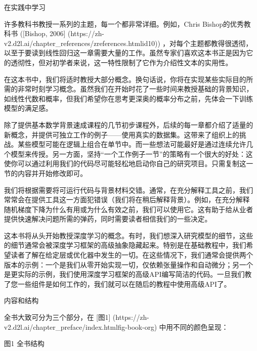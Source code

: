  在实践中学习

许多教科书教授一系列的主题，每一个都非常详细。例如，Chris Bishop的优秀教科书 ([Bishop, 2006]
(https://zh-v2.d2l.ai/chapter\_references/zreferences.htmlid10)) 
，对每个主题都教得很透彻，以至于要读到线性回归这一章需要大量的工作。虽然专家们喜欢这本书正是因为它的透彻性，但对初学者来说，这一特性限制了它作为介绍性文本的实用性。

在这本书中，我们将适时教授大部分概念。换句话说，你将在实现某些实际目的所需的非常时刻学习概念。虽然我们在开始时花了一些时间来教授基础的背景知识，如线性代数和概率，但我们希望你在思考更深奥的概率分布之前，先体会一下训练模型的满足感。

除了提供基本数学背景速成课程的几节初步课程外，后续的每一章都介绍了适量的新概念，并提供可独立工作的例子——使用真实的数据集。这带来了组织上的挑战。某些模型可能在逻辑上组合在单节中。而一些想法可能最好是通过连续允许几个模型来传授。另一方面，坚持“一个工作例子一节”的策略有一个很大的好处：这使你可以通过利用我们的代码尽可能轻松地启动你自己的研究项目。只需复制这一节的内容并开始修改即可。

我们将根据需要将可运行代码与背景材料交错。通常，在充分解释工具之前，我们常常会在提供工具这一方面犯错误（我们将在稍后解释背景）。例如，在充分解释随机梯度下降为什么有用或为什么有效之前，我们可以使用它。这有助于给从业者提供快速解决问题所需的弹药，同时需要读者相信我们的一些决定。

这本书将从头开始教授深度学习的概念。有时，我们想深入研究模型的细节，这些的细节通常会被深度学习框架的高级抽象隐藏起来。特别是在基础教程中，我们希望读者了解在给定层或优化器中发生的一切。在这些情况下，我们通常会提供两个版本的示例：一个是我们从零开始实现一切，仅依赖张量操作和自动微分；另一个是更实际的示例，我们使用深度学习框架的高级API编写简洁的代码。一旦我们教了您一些组件是如何工作的，我们就可以在随后的教程中使用高级API了。

 内容和结构

全书大致可分为三个部分，在 [图1]
(https://zh-v2.d2l.ai/chapter\_preface/index.htmlfig-book-org) 
中用不同的颜色呈现：

图1 全书结构

